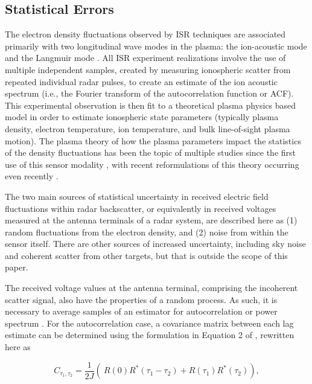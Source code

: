 \documentclass[draft,ras]{agutex}
\begin{document}
\begin{article}
\subsection{Statistical Errors}

The electron density fluctuations observed by ISR techniques are associated primarily with two longitudinal wave modes in the plasma: the ion-acoustic mode and the Langmuir mode \citep{chen1984introduction}.  All ISR experiment realizations involve the use of multiple independent samples, created by measuring ionospheric scatter from repeated individual radar pulses, to create an estimate of the ion acoustic spectrum (i.e., the Fourier transform of the autocorrelation function or ACF). This experimental observation is then fit to a theoretical plasma physics based model in order to estimate ionospheric state parameters (typically plasma density, electron temperature, ion temperature, and bulk line-of-sight plasma motion). The plasma theory of how the plasma parameters impact the statistics of the density fluctuations has been the topic of multiple studies since the first use of this sensor modality \citep{gordon58,dougherty:farley1960, farleydougherty:ISR2, doughteryfarley:ISR3, hagfors1961}, with recent reformulations of this theory occurring even recently  \citep{kudeki:milla:1,kudeki:milla:2}. 

The two main sources of statistical uncertainty in received electric field fluctuations within radar backscatter, or equivalently in received voltages measured at the antenna terminals of a radar system, are described here as (1) random fluctuations from the electron density, and (2) noise from within the sensor itself. There are other sources of increased uncertainty, including sky noise and coherent scatter from other targets, but that is outside the scope of this paper.

The received voltage values at the antenna terminal, comprising the incoherent scatter signal, also have the properties of a random process. As such, it is necessary to average samples of an estimator for autocorrelation or power spectrum \citep{Diaz:2008co}.  For the autocorrelation case, a covariance matrix between each lag estimate can be determined using the formulation in Equation 2 of \citet{hysell2008}, rewritten here as

\begin{equation}
\label{eqn:covcalc}
C_{\tau_1,\tau_2} = \frac{1}{2J} \left( \ R(0)  R^*(\tau_1-\tau_2) +  R(\tau_1) R^*(\tau_2) \right),
\end{equation}


\end{article}
\end{document}
